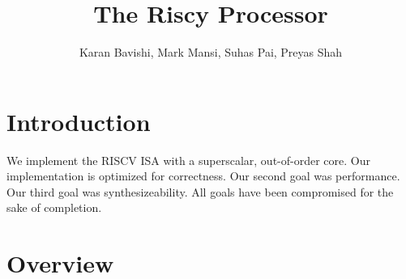 \documentclass{article}
\title{The Riscy Processor}
\author{Karan Bavishi, Mark Mansi, Suhas Pai, Preyas Shah}
\begin{document}
\maketitle

\section{Introduction}

We implement the RISCV ISA with a superscalar, out-of-order core. Our
implementation is optimized for correctness. Our second goal was performance.
Our third goal was synthesizeability. All goals have been compromised for the
sake of completion.

\section{Overview}
\end{document}
